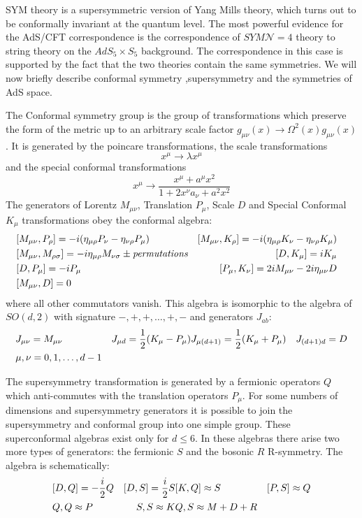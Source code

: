 \documentclass[11pt,a4paper]{article}
\begin{document}
SYM theory is a supersymmetric version of Yang Mills theory, which turns out to be conformally invariant at the quantum level. The most powerful evidence for the AdS/CFT correspondence is the correspondence of $SYM\mathcal{N}=4$ theory to string theory on the $AdS_5\times S_5$ background. The correspondence in this case is supported by the fact that the two theories contain the same symmetries. We will now briefly describe conformal symmetry ,supersymmetry and the symmetries of AdS space.

The Conformal symmetry group is the group of transformations which preserve the form of the metric up to an arbitrary scale factor $g_{\mu\nu}\left(x\right)\rightarrow\Omega^2\left(x\right)g_{\mu\nu}\left(x\right)$. It is generated by the poincare transformations, the scale transformations
\begin{equation}
x^\mu\rightarrow\lambda x^\mu
\end{equation}
and the special conformal transformations
\begin{equation}
x^\mu\rightarrow\frac{x^\mu+a^\mu x^2}{1+2x^\nu a_\nu+a^2x^2} 
\end{equation}
The generators of Lorentz $M_{\mu\nu}$, Translation $P_\mu$, Scale $D$ and Special Conformal $K_\mu$ transformations obey the conformal algebra:
\begin{align}
&[M_{\mu\nu},P_\rho]=-i(\eta_{\mu\rho}P_\nu-\eta_{\nu\rho}P_\mu) &[M_{\mu\nu},K_\rho]=-i(\eta_{\mu\rho}K_\nu-\eta_{\nu\rho}K_\mu) \notag \\
&[M_{\mu\nu},M_{\rho\sigma}]=-i\eta_{\mu\rho}M_{\nu\sigma}\pm\textit{permutations} &[D,K_\mu]=iK_\mu \notag \\
&[D,P_\mu]=-iP_\mu &[P_\mu,K_\nu]=2iM_{\mu\nu}-2i\eta_{\mu\nu}D & \notag \\
&[M_{\mu\nu},D]=0
\end{align}
where all other commutators vanish. This algebra is isomorphic to the algebra of $SO(d,2)$ with signature $-,+,+,\hdots,+,-$ and generators $J_{ab}$:
\begin{align}
&J_{\mu\nu}=M_{\mu\nu} &J_{\mu d}=\frac{1}{2}(K_\mu-P_\mu) &J_{\mu(d+1)}=\frac{1}{2}(K_\mu+P_\mu) &J_{(d+1)d}=D \\
&\mu,\nu=0,1,\hdots,d-1 \notag
\end{align}

The supersymmetry transformation is generated by a fermionic operators $Q$ which anti-commutes with the translation operators $P_\mu$. For some numbers of dimensions and supersymmetry generators it is possible to join the supersymmetry and conformal group into one simple group. These superconformal algebras exist only for $d\leq 6$. In these algebras there arise two more types of generators: the fermionic $S$ and the bosonic $R$ R-symmetry. The algebra is schematically:
\begin{align}
&[D,Q]=-\frac{i}{2}Q & [D,S]=\frac{i}{2}S &[K,Q]\approx S &[P,S]\approx Q \notag \\
&{Q,Q}\approx P &{S,S}\approx K &{Q,S}\approx M+D+R
\end{align}
\end{document}
